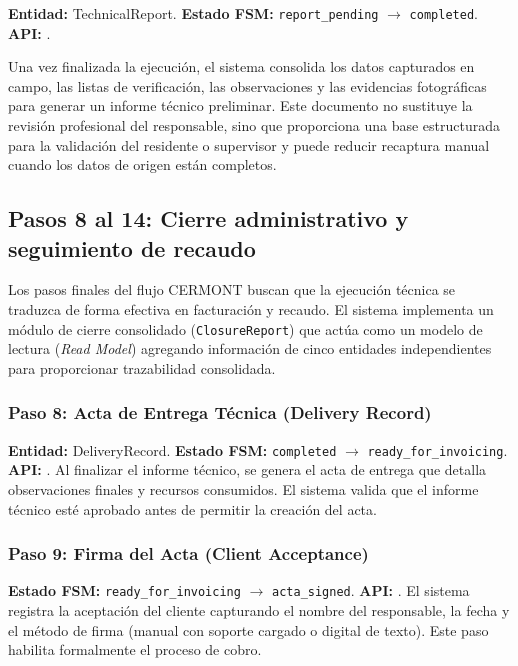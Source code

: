\textbf{Entidad:} TechnicalReport. \textbf{Estado FSM:} \texttt{report\_pending} $\rightarrow$ \texttt{completed}. \textbf{API:} .

Una vez finalizada la ejecución, el sistema consolida los datos capturados en campo, las listas de verificación, las observaciones y las evidencias fotográficas para generar un informe técnico preliminar. Este documento no sustituye la revisión profesional del responsable, sino que proporciona una base estructurada para la validación del residente o supervisor y puede reducir recaptura manual cuando los datos de origen están completos.

\subsection{Pasos 8 al 14: Cierre administrativo y seguimiento de recaudo}

Los pasos finales del flujo CERMONT buscan que la ejecución técnica se traduzca de forma efectiva en facturación y recaudo. El sistema implementa un módulo de cierre consolidado (\texttt{ClosureReport}) que actúa como un modelo de lectura (\textit{Read Model}) agregando información de cinco entidades independientes para proporcionar trazabilidad consolidada.

\subsubsection{Paso 8: Acta de Entrega Técnica (Delivery Record)}
\textbf{Entidad:} DeliveryRecord. \textbf{Estado FSM:} \texttt{completed} $\rightarrow$ \texttt{ready\_for\_invoicing}. \textbf{API:} .
Al finalizar el informe técnico, se genera el acta de entrega que detalla observaciones finales y recursos consumidos. El sistema valida que el informe técnico esté aprobado antes de permitir la creación del acta.

\subsubsection{Paso 9: Firma del Acta (Client Acceptance)}
\textbf{Estado FSM:} \texttt{ready\_for\_invoicing} $\rightarrow$ \texttt{acta\_signed}. \textbf{API:} .
El sistema registra la aceptación del cliente capturando el nombre del responsable, la fecha y el método de firma (manual con soporte cargado o digital de texto). Este paso habilita formalmente el proceso de cobro.

